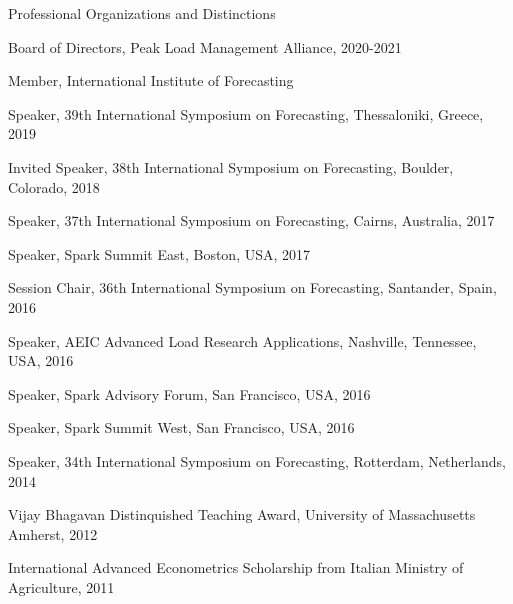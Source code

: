 \documentclass{resume} %
\begin{document}

\begin{rSection}{Professional Organizations and Distinctions}

\item Board of Directors, Peak Load Management Alliance, 2020-2021
\item Member, International Institute of Forecasting
\item Speaker, 39th International Symposium on Forecasting, Thessaloniki, Greece, 2019
\item Invited Speaker, 38th International Symposium on Forecasting, Boulder, Colorado, 2018
\item Speaker, 37th International Symposium on Forecasting, Cairns, Australia, 2017
\item Speaker, Spark Summit East, Boston, USA, 2017
\item Session Chair, 36th International Symposium on Forecasting, Santander, Spain, 2016
\item Speaker, AEIC Advanced Load Research Applications, Nashville, Tennessee, USA, 2016
\item Speaker, Spark Advisory Forum, San Francisco, USA, 2016
\item Speaker, Spark Summit West, San Francisco, USA, 2016
\item Speaker, 34th International Symposium on Forecasting, Rotterdam, Netherlands, 2014
\item Vijay Bhagavan Distinquished Teaching Award, University of Massachusetts Amherst, 2012
\item International Advanced Econometrics Scholarship from Italian Ministry of Agriculture, 2011

\end{rSection}

\pagebreak

\end{document}
